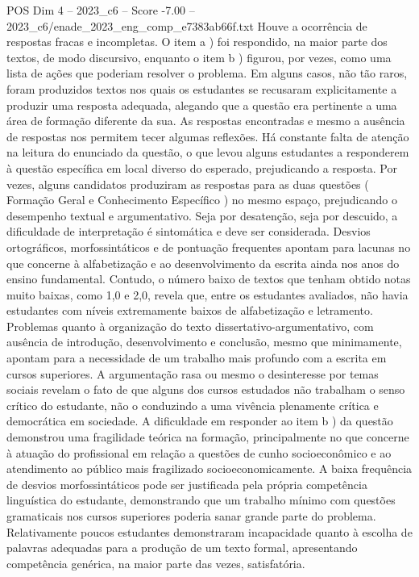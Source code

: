 \begin{textsample}{POS Dim 4 – 2023\_c6 – Score -7.00 – 2023\_c6/enade\_2023\_eng\_comp\_e7383ab66f.txt}
Houve a ocorrência de respostas fracas e incompletas.
O item a ) foi respondido, na maior parte dos textos, de modo discursivo, enquanto o item b ) figurou, por vezes, como uma lista de ações que poderiam resolver o problema.
Em alguns casos, não tão raros, foram produzidos textos nos quais os estudantes se recusaram explicitamente a produzir uma resposta adequada, alegando que a questão era pertinente a uma área de formação diferente da sua.
As respostas encontradas e mesmo a ausência de respostas nos permitem tecer algumas reflexões.
Há constante falta de atenção na leitura do enunciado da questão, o que levou alguns estudantes a responderem à questão específica em local diverso do esperado, prejudicando a resposta.
Por vezes, alguns candidatos produziram as respostas para as duas questões ( Formação Geral e Conhecimento Específico ) no mesmo espaço, prejudicando o desempenho textual e argumentativo.
Seja por desatenção, seja por descuido, a dificuldade de interpretação é sintomática e deve ser considerada.
Desvios ortográficos, morfossintáticos e de pontuação frequentes apontam para lacunas no que concerne à alfabetização e ao desenvolvimento da escrita ainda nos anos do ensino fundamental.
Contudo, o número baixo de textos que tenham obtido notas muito baixas, como 1,0 e 2,0, revela que, entre os estudantes avaliados, não havia estudantes com níveis extremamente baixos de alfabetização e letramento.
Problemas quanto à organização do texto dissertativo-argumentativo, com ausência de introdução, desenvolvimento e conclusão, mesmo que minimamente, apontam para a necessidade de um trabalho mais profundo com a escrita em cursos superiores.
A argumentação rasa ou mesmo o desinteresse por temas sociais revelam o fato de que alguns dos cursos estudados não trabalham o senso crítico do estudante, não o conduzindo a uma vivência plenamente crítica e democrática em sociedade.
A dificuldade em responder ao item b ) da questão demonstrou uma fragilidade teórica na formação, principalmente no que concerne à atuação do profissional em relação a questões de cunho socioeconômico e ao atendimento ao público mais fragilizado socioeconomicamente.
A baixa frequência de desvios morfossintáticos pode ser justificada pela própria competência linguística do estudante, demonstrando que um trabalho mínimo com questões gramaticais nos cursos superiores poderia sanar grande parte do problema.
Relativamente poucos estudantes demonstraram incapacidade quanto à escolha de palavras adequadas para a produção de um texto formal, apresentando competência genérica, na maior parte das vezes, satisfatória.

\end{textsample}
